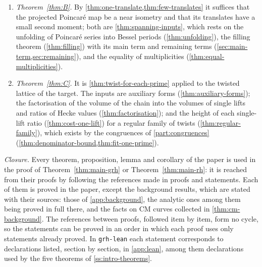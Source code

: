 \begin{enumerate}[label=\textup{(S\arabic*)},leftmargin=2.6em]
Poincar\'e image as a composite lift of a source form. The size of the composite lift
(\cref{thm:composite-size}) and its divisibility (\cref{thm:divisibility}), computed from the
derivatives of theta functions of \cref{part:derivatives}, give part~(a); part~(b) is the divisibility
read as an index (\cref{sec:size}).
\item \emph{Theorem~\ref{thm:B}.} By \cref{thm:one-translate,thm:few-translates} it suffices that the
projected Poincar\'e map be a near isometry and that its translates have a small second moment; both
are \cref{thm:spanning-inputs}, which rests on the unfolding of Poincar\'e series into Bessel periods
(\cref{thm:unfolding}), the filling theorem (\cref{thm:filling}) with its main term and remaining terms
(\cref{sec:main-term,sec:remaining}), and the equality of multiplicities (\cref{thm:equal-multiplicities}).
\item \emph{Theorem~\ref{thm:C}.} It is \cref{thm:twist-for-each-prime} applied to the twisted lattice of
the target. The inputs are auxiliary forms (\cref{thm:auxiliary-forms}); the factorisation of the
volume of the chain into the volumes of single lifts and ratios of Hecke values
(\cref{thm:factorisation}); and the height of each single-lift ratio (\cref{thm:cost-one-lift}) for a
regular family of twists (\cref{thm:regular-family}), which exists by the congruences of
\cref{part:congruences} (\cref{thm:denominator-bound,thm:fit-one-prime}).
\end{enumerate}

\emph{Closure.} Every theorem, proposition, lemma and corollary of the paper is used in the proof of
Theorem~\ref{thm:main-grh} or Theorem~\ref{thm:main-rh}: it is reached from their proofs by following
the references made in proofs and statements. Each of them is proved in the paper, except the
background results, which are stated with their sources: those of \cref{app:background}, the
analytic ones among them being proved in full there, and the facts on CM curves collected in
\cref{thm:cm-background}. The references between proofs, followed item by item, form no cycle, so the
statements can be proved in an order in which each proof uses only statements already proved. In
\texttt{grh-lean} each statement corresponds to declarations listed, section by section, in
\cref{app:lean}, among them declarations used by the five theorems of \cref{ss:intro-theorems}.

